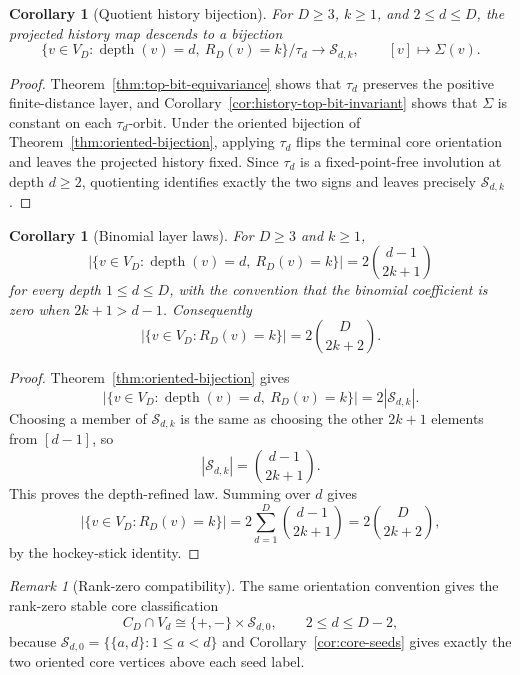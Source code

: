 \documentclass[11pt]{article}
\newtheorem{corollary}[theorem]{Corollary}
\theoremstyle{definition}
\theoremstyle{remark}
\newtheorem{remark}[theorem]{Remark}
\newcommand{\depth}{\operatorname{depth}}
\newcommand{\Sfam}{\mathcal S}
\begin{document}
\begin{corollary}[Quotient history bijection]\label{cor:quotient-bijection}
For $D\ge3$, $k\ge1$, and $2\le d\le D$, the projected history map descends to a bijection
\[
\{v\in V_D:\depth(v)=d,
\ R_D(v)=k\}/\tau_d
\longrightarrow
\Sfam_{d,k},
\qquad
[v]\longmapsto\Sigma(v).
\]
\end{corollary}

\begin{proof}
Theorem~\ref{thm:top-bit-equivariance} shows that $\tau_d$ preserves the positive finite-distance layer, and Corollary~\ref{cor:history-top-bit-invariant} shows that $\Sigma$ is constant on each $\tau_d$-orbit.  Under the oriented bijection of Theorem~\ref{thm:oriented-bijection}, applying $\tau_d$ flips the terminal core orientation and leaves the projected history fixed.  Since $\tau_d$ is a fixed-point-free involution at depth $d\ge2$, quotienting identifies exactly the two signs and leaves precisely $\Sfam_{d,k}$.
\end{proof}

\begin{corollary}[Binomial layer laws]\label{cor:binomial-laws}
For $D\ge3$ and $k\ge1$,
\[
\bigl|\{v\in V_D:\depth(v)=d,
\ R_D(v)=k\}\bigr|
=2\binom{d-1}{2k+1}
\]
for every depth $1\le d\le D$, with the convention that the binomial coefficient is zero when $2k+1>d-1$.  Consequently
\[
\bigl|\{v\in V_D:R_D(v)=k\}\bigr|
=2\binom D{2k+2}.
\]
\end{corollary}

\begin{proof}
Theorem~\ref{thm:oriented-bijection} gives
\[
\bigl|\{v\in V_D:\depth(v)=d,
\ R_D(v)=k\}\bigr|=2|\Sfam_{d,k}|.
\]
Choosing a member of $\Sfam_{d,k}$ is the same as choosing the other $2k+1$ elements from $[d-1]$, so
\[
|\Sfam_{d,k}|=\binom{d-1}{2k+1}.
\]
This proves the depth-refined law.  Summing over $d$ gives
\[
\bigl|\{v\in V_D:R_D(v)=k\}\bigr|
=2\sum_{d=1}^D\binom{d-1}{2k+1}
=2\binom D{2k+2},
\]
by the hockey-stick identity.
\end{proof}

\begin{remark}[Rank-zero compatibility]
The same orientation convention gives the rank-zero stable core classification
\[
C_D\cap V_d
\cong
\{+,-\}\times\Sfam_{d,0},
\qquad
2\le d\le D-2,
\]
because $\Sfam_{d,0}=\{\{a,d\}:1\le a<d\}$ and Corollary~\ref{cor:core-seeds} gives exactly the two oriented core vertices above each seed label.
\end{remark}
\end{document}
